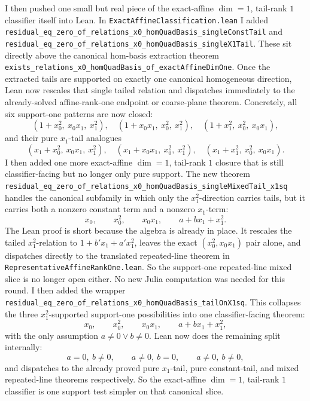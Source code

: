 \documentclass[11pt]{article}
\begin{document}
I then pushed one small but real piece of the exact-affine \(\dim=1\),
tail-rank \(1\) classifier itself into Lean. In
\texttt{ExactAffineClassification.lean} I added
\texttt{residual\_eq\_zero\_of\_relations\_x0\_homQuadBasis\_singleConstTail}
and
\texttt{residual\_eq\_zero\_of\_relations\_x0\_homQuadBasis\_singleX1Tail}.
These sit directly above the canonical hom-basis extraction theorem
\texttt{exists\_relations\_x0\_homQuadBasis\_of\_exactAffineDimOne}. Once the
extracted tails are supported on exactly one canonical homogeneous direction,
Lean now rescales that single tailed relation and dispatches immediately to the
already-solved affine-rank-one endpoint or coarse-plane theorem. Concretely,
all six support-one patterns are now closed:
\[
  (1+x_0^2,\ x_0x_1,\ x_1^2),\quad
  (1+x_0x_1,\ x_0^2,\ x_1^2),\quad
  (1+x_1^2,\ x_0^2,\ x_0x_1),
\]
and their pure \(x_1\)-tail analogues
\[
  (x_1+x_0^2,\ x_0x_1,\ x_1^2),\quad
  (x_1+x_0x_1,\ x_0^2,\ x_1^2),\quad
  (x_1+x_1^2,\ x_0^2,\ x_0x_1).
\]
I then added one more exact-affine \(\dim=1\), tail-rank \(1\) closure that is
still classifier-facing but no longer only pure support. The new theorem
\texttt{residual\_eq\_zero\_of\_relations\_x0\_homQuadBasis\_singleMixedTail\_x1sq}
handles the canonical subfamily in which only the \(x_1^2\)-direction carries
tails, but it carries both a nonzero constant term and a nonzero \(x_1\)-term:
\[
  x_0,\qquad x_0^2,\qquad x_0x_1,\qquad a + b x_1 + x_1^2.
\]
The Lean proof is short because the algebra is already in place. It rescales
the tailed \(x_1^2\)-relation to \(1 + b' x_1 + a' x_1^2\), leaves the exact
\((x_0^2,x_0x_1)\) pair alone, and dispatches directly to the translated
repeated-line theorem in \texttt{RepresentativeAffineRankOne.lean}. So the
support-one repeated-line mixed slice is no longer open either. No new Julia
computation was needed for this round.
I then added the wrapper
\texttt{residual\_eq\_zero\_of\_relations\_x0\_homQuadBasis\_tailOnX1sq}. This
collapses the three \(x_1^2\)-supported support-one possibilities into one
classifier-facing theorem:
\[
  x_0,\qquad x_0^2,\qquad x_0x_1,\qquad a + b x_1 + x_1^2,
\]
with the only assumption \(a \neq 0 \vee b \neq 0\). Lean now does the
remaining split internally:
\[
  a = 0,\ b \neq 0,\qquad a \neq 0,\ b = 0,\qquad a \neq 0,\ b \neq 0,
\]
and dispatches to the already proved pure \(x_1\)-tail, pure constant-tail,
and mixed repeated-line theorems respectively. So the exact-affine
\(\dim=1\), tail-rank \(1\) classifier is one support test simpler on that
canonical slice.
\end{document}

